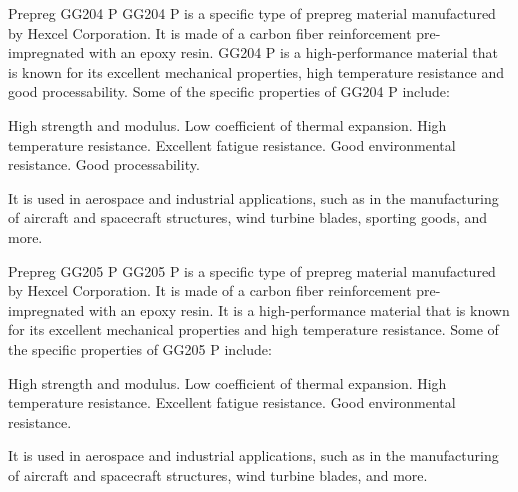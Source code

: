 \documentclass[10pt,aspectratio=169,dvipsnames]{beamer} %
\begin{document}
	\begin{frame}{Prepreg GG204 P}
		\justifying\footnotesize
		GG204 P is a specific type of prepreg material manufactured by Hexcel Corporation. 
		It is made of a carbon fiber reinforcement pre-impregnated with an epoxy resin. 
		GG204 P is a high-performance material that is known for its excellent mechanical properties, high temperature resistance and good processability. 
		Some of the specific properties of GG204 P include:
		
		High strength and modulus.
		Low coefficient of thermal expansion.
		High temperature resistance.
		Excellent fatigue resistance.
		Good environmental resistance.
		Good processability.
		
		It is used in aerospace and industrial applications, such as in the manufacturing of aircraft and spacecraft structures, wind turbine blades, sporting goods, and more.
	\end{frame}
	\begin{frame}{Prepreg GG205 P}
		\justifying\footnotesize
		GG205 P is a specific type of prepreg material manufactured by Hexcel Corporation. 
		It is made of a carbon fiber reinforcement pre-impregnated with an epoxy resin. 
		It is a high-performance material that is known for its excellent mechanical properties and high temperature resistance. 
		Some of the specific properties of GG205 P include:
		
		High strength and modulus.
		Low coefficient of thermal expansion.
		High temperature resistance.
		Excellent fatigue resistance.
		Good environmental resistance.
		
		It is used in aerospace and industrial applications, such as in the manufacturing of aircraft and spacecraft structures, wind turbine blades, and more.
	\end{frame}
\end{document}

